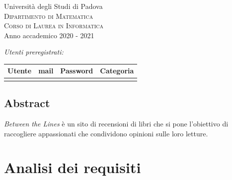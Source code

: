 \documentclass[12pt,a4paper,headings=optiontohead]{article}
\begin{document}
\begin{titlepage}
	\vspace{1.5cm}
	{\LARGE Università degli Studi di Padova}\\[0.4cm] %
	\textsc{\large{Dipartimento di Matematica}}\\[0.05cm]
	\textsc{\large{Corso di Laurea in Informatica}}\\[0.5cm]%
	{\Large Anno accademico 2020 - 2021}\\ %
	
	\vfill %
	
	
	
	\emph{\Large{Utenti preregistrati:}}\\
	
	\renewcommand{\arraystretch}{1.4}
	 \begin{center}
	 \begin{tabular}{|r|l|l|l|}
	 \hline
	\textbf{Utente} & \textbf{mail} & \textbf{Password} & \textbf{Categoria}  \\ \hline \hline
	 &  &  & \\ \hline
	
	 \end{tabular}
	 \end{center}
	
	\end{titlepage}
	
	
	\begin{center}
	\pagebreak
	
	\section*{Abstract}
	\begin{minipage}{0.9\textwidth} 
	\large{\textit{Between the Lines} è un sito di recensioni di libri che si pone l'obiettivo di raccogliere appassionati che condividono opinioni sulle loro letture.}
	\end{minipage}
	\end{center}
	\pagebreak
	
	\tableofcontents
	
	\section{Analisi dei requisiti}
	
\end{document}
